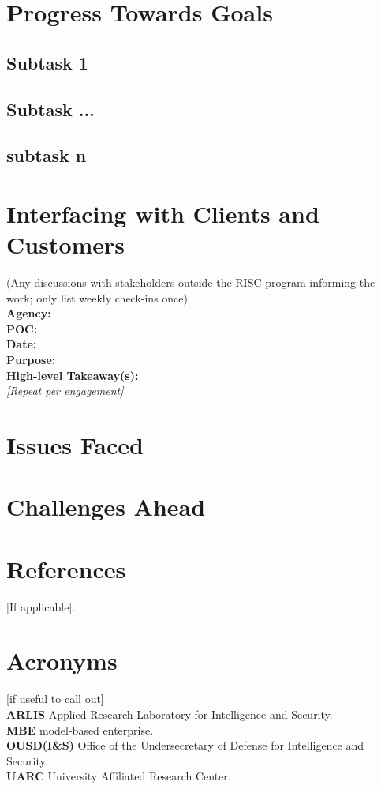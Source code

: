 \documentclass[letterpaper, 10pt]{article}
\begin{document}
\begin{multicols}{2}
    \section{Progress Towards Goals}
        \subsection{Subtask 1}
            \lipsum[5]
        \subsection{Subtask ...}
            \lipsum[6]
        \subsection{subtask n}
            \lipsum[7]
    \section{Interfacing with Clients and Customers}
        (Any discussions with stakeholders outside the RISC  program informing the work; only list weekly check-ins  once) \\
        \textbf{Agency:} \\  
        \textbf{POC:}  \\
        \textbf{Date:} \\
        \textbf{Purpose:} \\
        \textbf{High-level Takeaway(s):} \\ 
        \textit{[Repeat per engagement]} 

    \section{Issues Faced}
        \lipsum[8]
    \section{Challenges Ahead}
        \lipsum[9]
    \section{References}
        [If applicable].  
    \section{Acronyms}
        [if useful to call out] \\
        \textbf{ARLIS} Applied Research Laboratory for Intelligence and Security.\\ 
        \textbf{MBE} model-based enterprise. \\
        \textbf{OUSD(I\&S)} Office of the Undersecretary of Defense for  Intelligence and Security. \\
        \textbf{UARC} University Affiliated Research Center.\\
\end{multicols}
\end{document}
